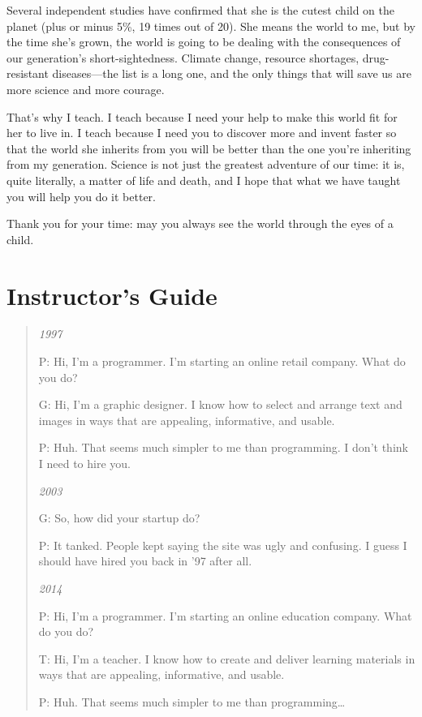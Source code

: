 \documentclass{book}
\begin{document}
Several independent studies have confirmed that she is the cutest child
on the planet (plus or minus 5\%, 19 times out of 20). She means the
world to me, but by the time she's grown, the world is going to be
dealing with the consequences of our generation's short-sightedness.
Climate change, resource shortages, drug-resistant diseases---the list
is a long one, and the only things that will save us are more science
and more courage.

That's why I teach. I teach because I need your help to make this world
fit for her to live in. I teach because I need you to discover more and
invent faster so that the world she inherits from you will be better
than the one you're inheriting from my generation. Science is not just
the greatest adventure of our time: it is, quite literally, a matter of
life and death, and I hope that what we have taught you will help you do
it better.

Thank you for your time: may you always see the world through the eyes
of a child.

\chapter{Instructor's Guide}\label{s:instructors}

\begin{quote}
\emph{1997}

P: Hi, I'm a programmer. I'm starting an online retail company. What do
you do?

G: Hi, I'm a graphic designer. I know how to select and arrange text and
images in ways that are appealing, informative, and usable.

P: Huh. That seems much simpler to me than programming. I don't think I
need to hire you.

\emph{2003}

G: So, how did your startup do?

P: It tanked. People kept saying the site was ugly and confusing. I
guess I should have hired you back in '97 after all.

\emph{2014}

P: Hi, I'm a programmer. I'm starting an online education company. What
do you do?

T: Hi, I'm a teacher. I know how to create and deliver learning
materials in ways that are appealing, informative, and usable.

P: Huh. That seems much simpler to me than programming\ldots{}
\end{quote}
\end{document}

